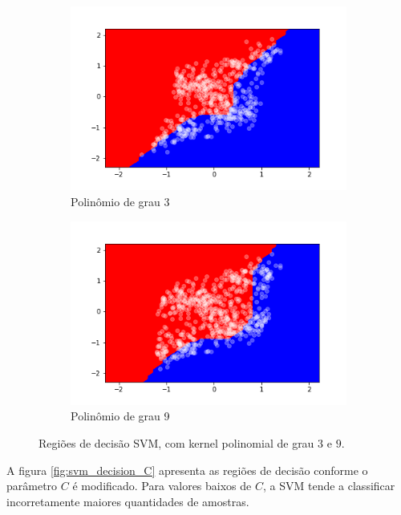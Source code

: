 \documentclass{article}
\begin{document}
    \begin{figure}[H]
        \begin{subfigure}{.5\textwidth}
            \centering
                \includegraphics[width=\linewidth]{svm_decision_poly.png}   
            \caption{Polinômio de grau 3}
        \end{subfigure}
        \begin{subfigure}{.5\textwidth}
            \centering
                \includegraphics[width=\linewidth]{svm_decision_poly_9.png}   
            \caption{Polinômio de grau 9}
        \end{subfigure}
        \caption{Regiões de decisão SVM, com kernel polinomial de grau $3$ e $9$.}
        \label{fig:svm_decision_poly}
    \end{figure}

    A figura \ref{fig:svm_decision_C} apresenta as regiões de decisão conforme o parâmetro
    $C$ é modificado. Para valores baixos de $C$, a SVM tende a classificar incorretamente
    maiores quantidades de amostras.
    
\end{document}
